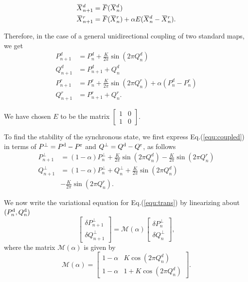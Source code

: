 \documentclass[reprint,amsmath,amssymb,aps,pre]{revtex4-1}
\newcommand{\overbar}[1]{\mkern 1.5mu\overline{\mkern-1.5mu#1\mkern-1.5mu}\mkern 1.5mu}
\begin{document}
\begin{align}
\overbar{X}^d_{n+1} &= \overbar{F}(\overbar{X}^d_{n}) \nonumber  \\
\overbar{X}^r_{n+1} &= \overbar{F}(\overbar{X}^r_{n}) + \alpha 
E(\overbar{X}^d_{n}-\overbar{X}^r_n).
\end{align}

Therefore, in the case of a general unidirectional coupling of two standard maps, we get
\begin{align}
P^d_{n+1} &= P^d_n + \frac{K}{2\pi}\sin(2\pi Q^d_n) \nonumber\\
Q^d_{n+1} &= P^d_{n+1} + Q^d_n \nonumber\\
P^r_{n+1} &= P^r_n + \frac{K}{2\pi}\sin (2\pi Q^r_n) + \alpha(P^d_n-P^r_n) \nonumber \\
Q^r_{n+1} &= P^r_{n+1} + Q^r_n.
\label{equ:coupled}
\end{align}


We have chosen $E$ to be the matrix $\begin{bmatrix} 1 & 0 \\ 1 & 0 \end{bmatrix}$. 

To find the stability of the synchronous state, we first express  
Eq.(\ref{equ:coupled}) in terms of  $P^\perp = P^\textnormal{d} - 
P^\textnormal{r}$ and $Q^\perp = Q^\textnormal{d} -Q^\textnormal{r}$, as 
follows
\begin{eqnarray}
\label{equ:trans}
P^\perp_{n+1} &= (1-\alpha)P^\perp_n+ \frac{K}{2\pi} \sin(2\pi Q^d_n) - 
\frac{K}{2\pi} \sin(2\pi Q^r_n) \nonumber \\ 
Q^\perp_{n+1} &= (1-\alpha)P^\perp_n+ Q^\perp_n + \frac{K}{2\pi} \sin(2\pi 
Q^d_n) \nonumber \\ &- \frac{K}{2\pi} \sin(2\pi Q^r_n).
\end{eqnarray}

We now write the variational equation for Eq.(\ref{equ:trans}) by linearizing 
about $(P^\textnormal{d}_n,Q^\textnormal{d}_n)$
\begin{equation}
\label{equ:variational}
\left[ \begin{array}{c} \delta P^\perp_{n+1} \\ \delta Q^\perp_{n+1} 
\end{array} \right] = \mathcal{M}(\alpha)\left[ \begin{array}{c}\delta 
P^\perp_{n} \\ \delta Q^\perp_{n} \end{array} \right],
\end{equation}
where the matrix $\mathcal{M}(\alpha)$ is given by
\begin{equation} 
\label{equ:M}
\mathcal{M}(\alpha) = \begin{bmatrix} 1-\alpha & K\cos(2\pi Q^d_n) \\ 1 - 
\alpha & 1 + K\cos(2\pi Q^d_n) \end{bmatrix}.
\end{equation}
\end{document}
